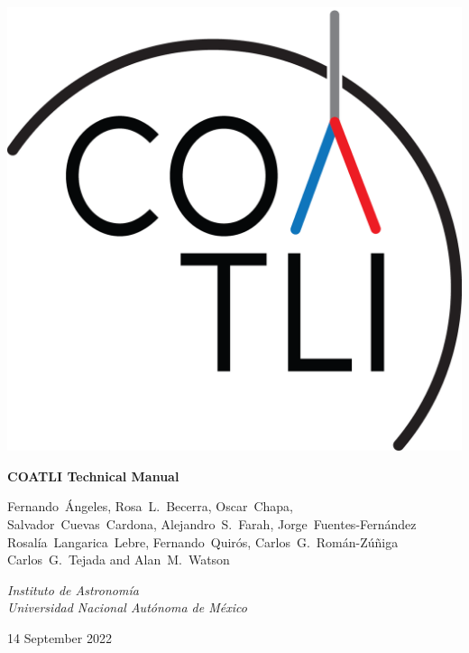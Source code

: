 
\pagestyle{empty}

\begin{centering}

\ifcoatli
\bigskip
\bigskip
\includegraphics[width=\linewidth]{figures/logo-gn.png}
\bigskip
\bigskip
{
 \Large
 \bfseries 
 COATLI Technical Manual
 \par
}
\bigskip
{
\baselineskip=10pt
 \large
 Fernando~Ángeles,
 Rosa~L.~Becerra,
 Oscar~Chapa,\\
 Salvador~Cuevas~Cardona,
 Alejandro~S.~Farah,
 Jorge~Fuentes-Fernández\\
 Rosalía~Langarica~Lebre,
 Fernando~Quirós,
 Carlos~G.~Román-Zúñiga\\
 Carlos~G.~Tejada
 and
 Alan~M.~Watson
 \par
}
\bigskip
{
 \large
 \itshape 
 Instituto de Astronomía\\
 Universidad Nacional Autónoma de México
 \par
}
\bigskip
{
 \large
 14 September 2022
}
\fi

\ifddoti
\bigskip
\bigskip


\end{centering}
